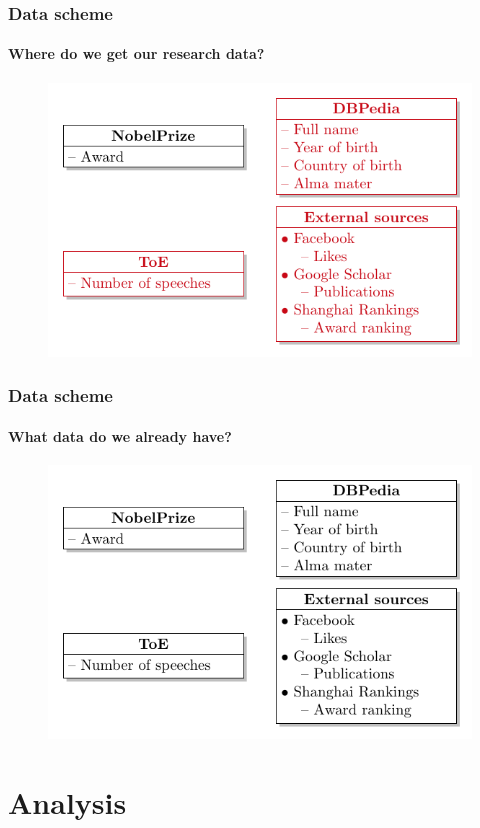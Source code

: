 \documentclass[nonav,sleutel]{beamer}
\begin{document}
\begin{frame}
\frametitle{Data scheme}
\framesubtitle{Where do we get our \textbf{\textcolor{Red7}{research}} data?}
\begin{figure}
	\includegraphics{images/dataschema_research}
\end{figure}
\end{frame}

\begin{frame}
\frametitle{Data scheme}
\framesubtitle{What data do we already have?}
\begin{figure}
	\includegraphics{images/dataschema_original}
\end{figure}
\end{frame}

\section{Analysis}
\end{document}
